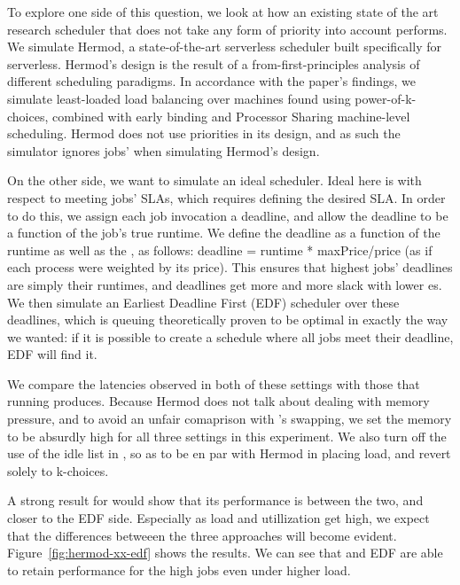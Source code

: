 To explore one side of this question, we look at how an existing state of the
art research scheduler that does not take any form of priority into account
performs. We simulate Hermod\cite{TODO}, a state-of-the-art serverless scheduler
built specifically for serverless. Hermod's design is the result of a
from-first-principles analysis of different scheduling paradigms. In accordance
with the paper's findings, we simulate least-loaded load balancing over machines
found using power-of-k-choices, combined with early binding and Processor
Sharing machine-level scheduling. Hermod does not use priorities in its design,
and as such the simulator ignores jobs' \class{} when simulating Hermod's
design.


On the other side, we want to simulate an ideal scheduler. Ideal here is with
respect to meeting jobs' SLAs, which requires defining the desired SLA. In order
to do this, we assign each job invocation a deadline, and allow the deadline to
be a function of the job's true runtime. We define the deadline as a function of
the runtime as well as the \priceclass{}, as follows: deadline = runtime *
maxPrice/price (as if each process were weighted by its price). This ensures
that highest \class{} jobs' deadlines are simply their runtimes, and deadlines
get more and more slack with lower \class{}es. We then simulate an Earliest
Deadline First (EDF) scheduler over these deadlines, which is queuing
theoretically proven to be optimal in exactly the way we wanted: if it is
possible to create a schedule where all jobs meet their deadline, EDF will find
it\cite{TODO}.

We compare the latencies observed in both of these settings with those that
running \sys{} produces. Because Hermod does not talk about dealing with memory
pressure, and to avoid an unfair comaprison with \sys{}'s swapping, we set the
memory to be absurdly high for all three settings in this experiment. We also
turn off the use of the idle list in \sys{}, so as to be en par with Hermod in
placing load, and revert solely to k-choices.

A strong result for \sys{} would show that its performance is between the two,
and closer to the EDF side. Especially as load and utillization get high, we
expect that the differences betweeen the three approaches will become evident.
Figure~\ref{fig:hermod-xx-edf} shows the results. We can see that \sys{} and EDF
are able to retain performance for the high \class{} jobs even under higher
load.


